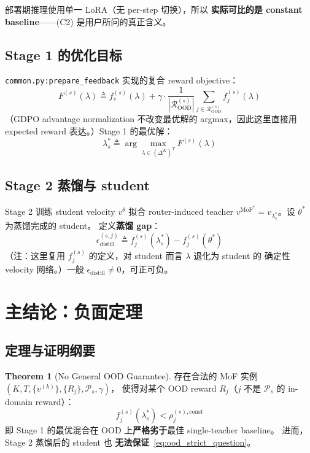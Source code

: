 \documentclass[11pt,a4paper]{article}
\newcommand{\MoF}{\mathrm{MoF}}
\newcommand{\OOD}{\mathrm{OOD}}
\newcommand{\const}{\mathrm{const}}
\theoremstyle{definition}
\newtheorem{theorem}{Theorem}
\begin{document}
部署期推理使用单一 LoRA（无 per-step 切换），所以
\textbf{实际可比的是 constant baseline}——(C2) 是用户所问的真正含义。

\subsection{Stage 1 的优化目标}

\texttt{common.py:prepare\_feedback} 实现的复合 reward objective：
\begin{equation}
F^{(s)}(\lambda) \triangleq f_s^{(s)}(\lambda) + \gamma \cdot \frac{1}{|\mathcal{R}_{\OOD}^{(s)}|}
\sum_{j \in \mathcal{R}_{\OOD}^{(s)}} f_j^{(s)}(\lambda)
\label{eq:composite_obj}
\end{equation}
（GDPO advantage normalization 不改变最优解的 argmax，因此这里直接用
expected reward 表达。）Stage 1 的最优解：
\begin{equation}
\lambda_s^* \triangleq \arg\max_{\lambda \in (\Delta^K)^T} F^{(s)}(\lambda)
\label{eq:stage1_opt}
\end{equation}

\subsection{Stage 2 蒸馏与 student}

Stage 2 训练 student velocity $v^\theta$ 拟合 router-induced teacher
$v^{\MoF^*} = v_{\lambda_s^*}$。设 $\theta^*$ 为蒸馏完成的 student。
定义\textbf{蒸馏 gap}：
\begin{equation}
\epsilon_{\text{distill}}^{(s,j)} \triangleq f_j^{(s)}(\lambda_s^*) - f_j^{(s)}(\theta^*)
\label{eq:distill_gap}
\end{equation}
（注：这里复用 $f_j^{(s)}$ 的定义，对 student 而言 $\lambda$ 退化为 student 的
确定性 velocity 网络。）一般 $\epsilon_{\text{distill}} \neq 0$，可正可负。

\section{主结论：负面定理}
\label{sec:negative}

\subsection{定理与证明纲要}

\begin{theorem}[No General OOD Guarantee]
\label{thm:no_general}
存在合法的 MoF 实例
$(K, T, \{v^{(k)}\}, \{R_j\}, \mathcal{P}_s, \gamma)$，
使得对某个 OOD reward $R_j$（$j$ 不是 $\mathcal{P}_s$ 的 in-domain reward）：
\begin{equation}
f_j^{(s)}(\lambda_s^*) < \rho_j^{(s),\const}
\label{eq:negative_main}
\end{equation}
即 Stage 1 的最优混合在 OOD 上\textbf{严格劣于}最佳 single-teacher baseline。
进而，Stage 2 蒸馏后的 student 也 \textbf{无法保证}~\eqref{eq:ood_strict_question}。
\end{theorem}
\end{document}
